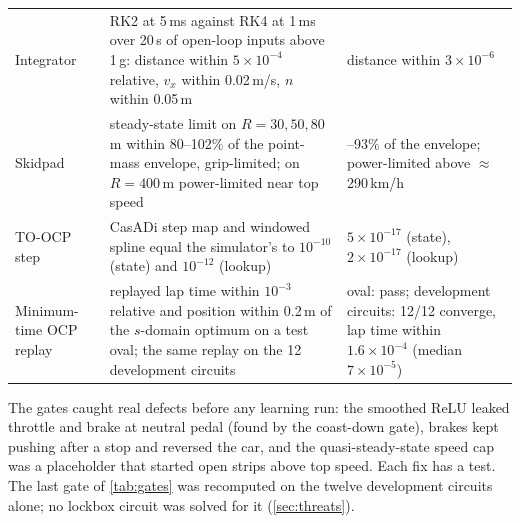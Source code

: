 \begin{table}[t]
\begin{tabularx}{\linewidth}{@{}>{\raggedright\arraybackslash}p{2.6cm}>{\raggedright\arraybackslash}X>{\raggedright\arraybackslash}p{2.6cm}@{}}
Integrator & RK2 at 5\,ms against RK4 at 1\,ms over 20\,s of open-loop inputs above
1\,g: distance within $5\times10^{-4}$ relative, $v_x$ within 0.02\,m/s, $n$ within
0.05\,m & distance within $3\times10^{-6}$ \\
Skidpad & steady-state limit on $R = 30, 50, 80$\,m within 80--102\% of the point-mass
envelope, grip-limited; on $R = 400$\,m power-limited near top speed & 91--93\% of the
envelope; power-limited above $\approx$290\,km/h \\
TO-OCP step & CasADi step map and windowed spline equal the simulator's to $10^{-10}$
(state) and $10^{-12}$ (lookup) & $5\times10^{-17}$ (state), $2\times10^{-17}$ (lookup) \\
Minimum-time OCP replay & replayed lap time within $10^{-3}$ relative and position within
0.2\,m of the $s$-domain optimum on a test oval; the same replay on the 12 development
circuits & oval: pass; development circuits: 12/12 converge, lap time within
$1.6\times10^{-4}$ (median $7\times10^{-5}$) \\
\bottomrule
\end{tabularx}
\end{table}

The gates caught real defects before any learning run: the smoothed ReLU leaked throttle
and brake at neutral pedal (found by the coast-down gate), brakes kept pushing after a
stop and reversed the car, and the quasi-steady-state speed cap was a placeholder that
started open strips above top speed. Each fix has a test.
The last gate of \cref{tab:gates} was recomputed on the twelve development circuits
alone; no lockbox circuit was solved for it (\cref{sec:threats}).
